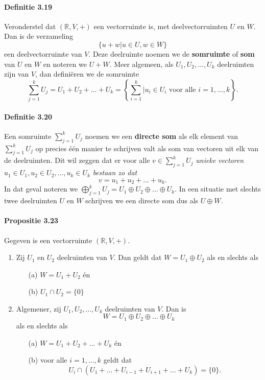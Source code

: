\documentclass[11pt,oneside,a4paper]{article}
\begin{document}
	\paragraph{Definitie 3.19}
		Veronderstel dat $(\mathbb{R}, V, +)$ een vectorruimte is, met deelvectorruimten $U$ en $W$. Dan is de verzameling $$\{u+w |u\in U, w\in W\}$$ een deelvectorruimte van $V$. Deze deelruimte noemen we de \textbf{somruimte} of \textbf{som} van $U$ en $W$ en noteren we $U+W$. Meer algemeen, als $U_1, U_2, \ldots , U_k$ deelruimten zijn van $V$, dan definiëren we de somruimte $$\sum\limits_{j=1}^k U_j = U_1 + U_2 + \ldots + U_k = \left\{\sum_{i=1}^k |u_i\in U_i \text{ voor alle } i= 1, \ldots, k\right\}.$$
	\paragraph{Definitie 3.20}
		Een somruimte $\sum_{j=1}^k U_j$ noemen we een \textbf{directe som} als elk element van $\sum_{j=1}^k U_j$ op precies één manier te schrijven valt als som van vectoren uit elk van de deelruimten. Dit wil zeggen dat er voor alle $v \in \sum_{j=1}^k U_j$ \textit{unieke vectoren} $u_1 \in U_1, u_2 \in U_2, \ldots, u_k \in U_k$ \textit{bestaan zo dat} $$v = u_1 + u_2 + \ldots + u_k.$$ In dat geval noteren we $\bigoplus_{j=1}^k U_j = U_1 \oplus U_2 \oplus \ldots \oplus U_k$. In een situatie met slechts twee deelruimten $U$ en $W$ schrijven we een directe som dus als $U \oplus W$.
	\paragraph{Propositie 3.23}
		Gegeven is een vectorruimte $(\mathbb{R}, V, +)$.
		\begin{enumerate}
			\item Zij $U_1 $ en $U_2$ deelruimten van $V$. Dan geldt dat $W = U_1 \oplus U_2$ als en slechts als
			\begin{itemize}
				\item[(a)] $W = U_1 + U_2$ én
				\item[(b)] $U_1 \cap U_2 = \{0\}$
			\end{itemize}
			\item Algemener, zij $U_1, U_2, \ldots , U_k$ deelruimten van $V$. Dan is $$W = U_1 \oplus U_2 \oplus \ldots \oplus U_k$$
			als en slechts als
			\begin{itemize}
				\item[(a)] $W = U_1 + U_2 + \ldots +U_k$ én
				\item[(b)] voor alle $i = 1, \ldots , k$ geldt dat $$U_i \cap (U_1 + \ldots + U_{i-1} + U_{i+1} + \ldots + U_k) = \{0\}.$$
			\end{itemize}
		\end{enumerate}
\end{document}
